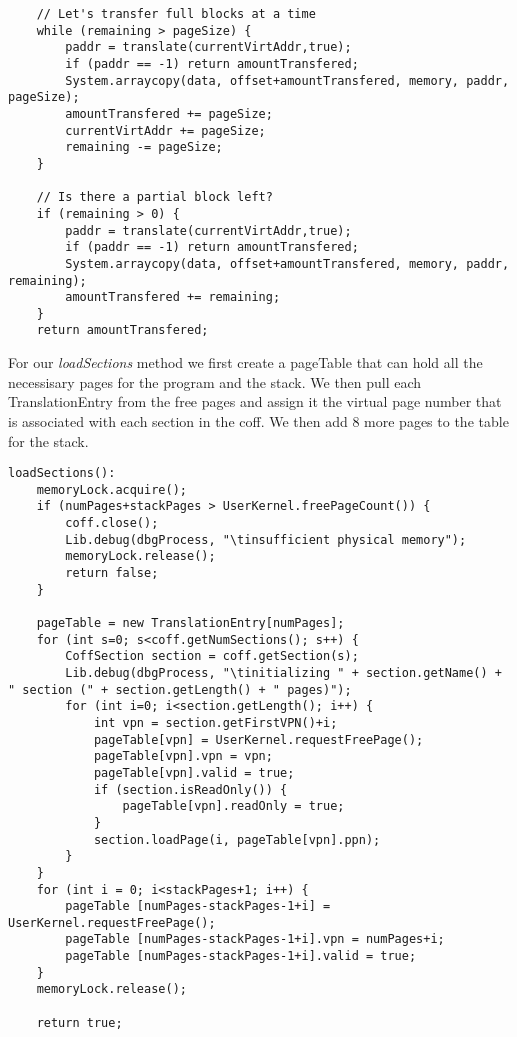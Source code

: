 \documentclass{article}
\begin{document}
\begin{itemize}
\begin{verbatim}
    // Let's transfer full blocks at a time
    while (remaining > pageSize) {
        paddr = translate(currentVirtAddr,true);
        if (paddr == -1) return amountTransfered;
        System.arraycopy(data, offset+amountTransfered, memory, paddr, pageSize);
        amountTransfered += pageSize;
        currentVirtAddr += pageSize;
        remaining -= pageSize;
    }

    // Is there a partial block left?
    if (remaining > 0) {
        paddr = translate(currentVirtAddr,true);
        if (paddr == -1) return amountTransfered;
        System.arraycopy(data, offset+amountTransfered, memory, paddr, remaining);
        amountTransfered += remaining;
    }
    return amountTransfered;
\end{verbatim}
\end{itemize}

For our \textit{loadSections} method we first create a pageTable that can hold
all the necessisary pages for the program and the stack. We then pull each
TranslationEntry from the free pages and assign it the virtual page number that
is associated with each section in the coff. We then add 8 more pages to the
table for the stack.

\begin{verbatim}
loadSections():
    memoryLock.acquire();
    if (numPages+stackPages > UserKernel.freePageCount()) {
        coff.close();
        Lib.debug(dbgProcess, "\tinsufficient physical memory");
        memoryLock.release();
        return false;
    }

    pageTable = new TranslationEntry[numPages];
    for (int s=0; s<coff.getNumSections(); s++) {
        CoffSection section = coff.getSection(s);
        Lib.debug(dbgProcess, "\tinitializing " + section.getName() + " section (" + section.getLength() + " pages)");
        for (int i=0; i<section.getLength(); i++) {
            int vpn = section.getFirstVPN()+i;
            pageTable[vpn] = UserKernel.requestFreePage();
            pageTable[vpn].vpn = vpn;
            pageTable[vpn].valid = true;
            if (section.isReadOnly()) {
                pageTable[vpn].readOnly = true;
            }
            section.loadPage(i, pageTable[vpn].ppn);
        }
    }
    for (int i = 0; i<stackPages+1; i++) {
        pageTable [numPages-stackPages-1+i] = UserKernel.requestFreePage();
        pageTable [numPages-stackPages-1+i].vpn = numPages+i;
        pageTable [numPages-stackPages-1+i].valid = true;
    }
    memoryLock.release();

    return true;
\end{verbatim}
\end{document}
